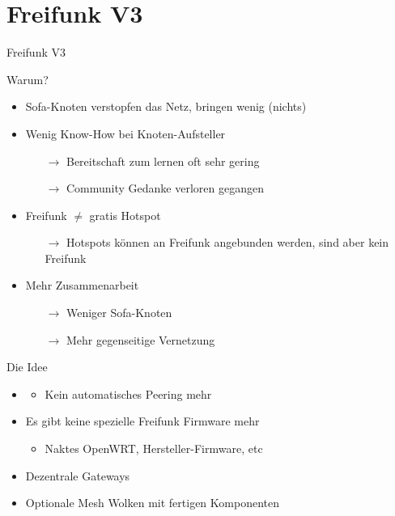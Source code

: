 \section{Freifunk V3}

\begin{frame}{}
    \begin{center}
        Freifunk V3
     \end{center}
\end{frame}

\begin{frame}{Warum?}
    \begin{itemize}
        \item \glqq{}Sofa-Knoten\grqq{} verstopfen das Netz, bringen wenig (nichts)
        \item Wenig Know-How bei Knoten-Aufsteller
        \begin{itemize}
            \item[$\rightarrow$] Bereitschaft zum lernen oft sehr gering
            \item[$\rightarrow$] Community Gedanke verloren gegangen
        \end{itemize}
        \item Freifunk $\neq$ gratis Hotspot
        \begin{itemize}
            \item[$\rightarrow$] Hotspots können an Freifunk angebunden werden, sind aber kein Freifunk
        \end{itemize}
        \item Mehr Zusammenarbeit
        \begin{itemize}
            \item[$\rightarrow$] Weniger \glqq{}Sofa-Knoten\grqq{}
            \item[$\rightarrow$] Mehr gegenseitige Vernetzung
        \end{itemize}
    \end{itemize}
\end{frame}

\begin{frame}{Die Idee}
    \begin{itemize}
        \item {}
        \begin{itemize}
            \item<3>[$\rightarrow$] Kein automatisches Peering mehr
        \end{itemize}
        \item<3> Es gibt keine spezielle Freifunk Firmware mehr
        \begin{itemize}
            \item Naktes OpenWRT, Hersteller-Firmware, etc
        \end{itemize}
        \item<3> Dezentrale Gateways
        \item<3> Optionale \glqq{}Mesh Wolken\grqq{} mit fertigen Komponenten
    \end{itemize}
\end{frame}

